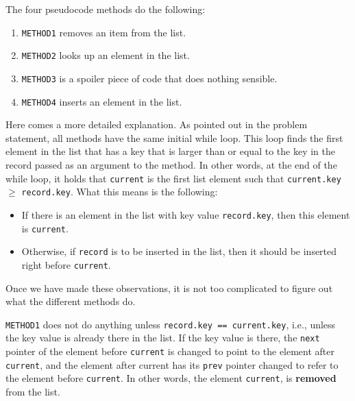 \documentclass{jn-pset}
\begin{document}
\begin{problem}
\begin{solution}
  The four pseudocode methods do the following:
  \begin{enumerate}
  \item
    \verb+METHOD1+
    removes an item from the list.
    
  \item
    \verb+METHOD2+
    looks up an element in the list.

  \item
    \verb+METHOD3+
    is a spoiler piece of code that does nothing sensible.

  \item
    \verb+METHOD4+
    inserts an element in the list.

  \end{enumerate}

  Here comes a more detailed explanation. As pointed out in the
  problem statement, all methods have the same
  initial while loop. This loop finds the first element in the list
  that has a key that is larger than or equal to the key in the record
  passed as an argument to the method.
  In other words, at the end of the while loop,
  it holds that
  \verb+current+
  is  the first list element such that
  \verb+current.key+ $\geq$
  \verb+record.key+.
  What this means is the following:
  \begin{itemize}
  \item
    If there is an element in the list with key value
    \verb+record.key+,
    then this element is
    \verb+current+.

  \item
    Otherwise, if
    \verb+record+
    is to be inserted in the list, then it should be inserted right before
    \verb+current+.
    
  \end{itemize}
%  
  Once we have made these observations, it is not too complicated to
  figure out what the different methods do.


  \verb+METHOD1+
  does not do anything unless
  \verb+record.key == current.key+,
  i.e., unless the key value is already there in the list.
  If the key value is there, the 
  \verb+next+
  pointer of the element before
  \verb+current+
  is changed to point to the element after
  \verb+current+,
  and the element after current has its
  \verb+prev+
  pointer changed to refer to the element before
  \verb+current+.
  In other words, the element
  \verb+current+,
  is \textbf{removed} from the list.
  


\end{solution}
\end{problem}
\end{document}
